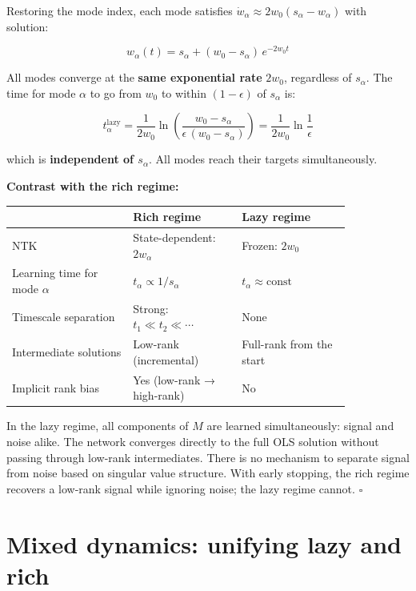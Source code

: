 \documentclass[11pt]{article}
\begin{document}
\begin{solution}[ex:td-4c]
Restoring the mode index, each mode satisfies
\(\dot{w}_\alpha \approx 2w_0(s_\alpha - w_\alpha)\) with solution:

\[w_\alpha(t) = s_\alpha + (w_0 - s_\alpha)\,e^{-2w_0 t}\]

All modes converge at the \textbf{same exponential rate} \(2w_0\),
regardless of \(s_\alpha\). The time for mode \(\alpha\) to go from
\(w_0\) to within \((1-\epsilon)\) of \(s_\alpha\) is:

\[t_\alpha^{\text{lazy}} = \frac{1}{2w_0}\ln\!\left(\frac{w_0 - s_\alpha}{\epsilon\,(w_0 - s_\alpha)}\right) = \frac{1}{2w_0}\ln\frac{1}{\epsilon}\]

which is \textbf{independent of \(s_\alpha\)}. All modes reach their
targets simultaneously.

\textbf{Contrast with the rich regime:}

\begin{center}
\begin{tabular}{p{0.30\linewidth}p{0.27\linewidth}p{0.27\linewidth}}
\hline
 & Rich regime & Lazy regime \\
\hline
NTK & State-dependent: \(2w_\alpha\) & Frozen: \(2w_0\) \\
Learning time for mode \(\alpha\) & \(t_\alpha \propto 1/s_\alpha\) & \(t_\alpha \approx \text{const}\) \\
Timescale separation & Strong: \(t_1 \ll t_2 \ll \cdots\) & None \\
Intermediate solutions & Low-rank (incremental) & Full-rank from the start \\
Implicit rank bias & Yes (low-rank → high-rank) & No \\
\hline
\end{tabular}
\end{center}
In the lazy regime, all components of \(M\) are learned simultaneously:
signal and noise alike. The network converges directly to the full OLS
solution without passing through low-rank intermediates. There is no
mechanism to separate signal from noise based on singular value
structure. With early stopping, the rich regime recovers a low-rank
signal while ignoring noise; the lazy regime cannot. \(\square\)
\end{solution}

\section{Mixed dynamics: unifying lazy and rich}
\label{sec:td-mixed}
\end{document}
